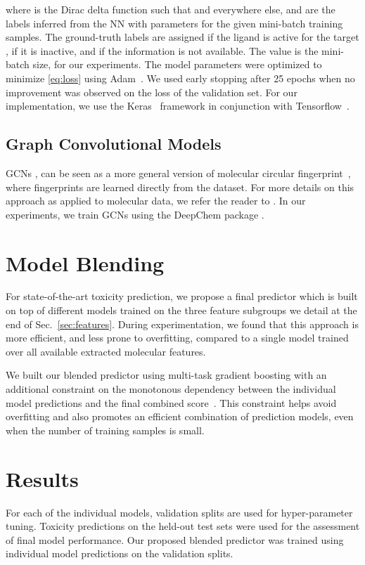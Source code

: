 \documentclass[11pt,a4paper]{article}
\begin{document}
where  is the Dirac delta function such that  and  everywhere 
else, and  are the labels inferred
from the NN with parameters  for the given mini-batch training samples. 
The ground-truth labels  are assigned  if the ligand  
is active for the target ,  if it is inactive, and  if the information is not available. 
The value  is the mini-batch size,  for our experiments. 
The model parameters  were optimized to minimize 
\eqref{eq:loss} using Adam~\cite{KB2014}. 
We used early stopping after 25 epochs when no improvement was observed on the 
loss of the validation set. For our implementation, we use the
Keras~\cite{Cho2015} framework in conjunction with 
Tensorflow~\cite{tensorflow2015-whitepaper}.

\subsection{Graph Convolutional Models}
GCNs \cite{Duvenaud:2015aa}, 
can be seen as a more general version of molecular circular
fingerprint~\cite{Glen:2006ab}, where fingerprints are learned directly from 
the dataset. For more details on this approach as applied to molecular data, 
we refer the reader to \cite{Wu:2017, Duvenaud:2015aa}. In our experiments, we
train GCNs using the DeepChem package \cite{Wu:2017}.

\section{Model Blending}\label{sec:blend}

For state-of-the-art toxicity prediction, we propose a final predictor which
is built on top of different models trained on the three feature subgroups we detail
at the end of Sec.~\ref{sec:features}. During experimentation, we found that 
this approach is more efficient, and less prone to overfitting,
compared to a single model trained over all available extracted molecular features.

We built our blended predictor using  multi-task gradient boosting
with an additional constraint on the monotonous dependency between the individual
model predictions and the final combined score~\cite{Ridgeway:2007aa}. 
This constraint helps avoid overfitting and also promotes an efficient 
combination of prediction models, even when the number of training samples is small.

\section{Results}\label{sec:results}
For each of the individual models, validation splits are used for hyper-parameter tuning.
Toxicity predictions on the held-out test sets were used for the assessment of final
model performance.
Our proposed blended predictor was trained using individual model predictions on
the validation splits.               
\end{document}
